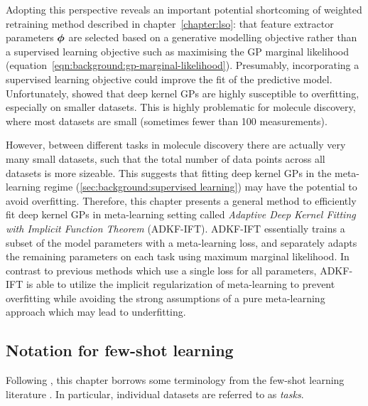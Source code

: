 Adopting this perspective reveals an important potential shortcoming of
weighted retraining method described in chapter~\ref{chapter:lso}:
that feature extractor parameters $\operatorname{\boldsymbol{\phi}}$ are selected based on a generative modelling
objective rather than a supervised learning objective
such as maximising the GP marginal likelihood
(equation~\ref{eqn:background:gp-marginal-likelihood}).
Presumably, incorporating a supervised learning objective
could improve the fit of the predictive model.
Unfortunately, \citet{ober21a} showed that deep kernel GPs
are highly susceptible to overfitting,
especially on smaller datasets.
This is highly problematic for molecule discovery, where most datasets are small
(sometimes fewer than 100 measurements).

However, between different tasks in molecule discovery
there are actually very many small datasets,
such that the total number of data points across all datasets is more sizeable.
This suggests that fitting deep kernel GPs in the meta-learning regime 
(\cref{sec:background:supervised learning}) may have the potential to avoid overfitting.
Therefore, this chapter presents a general method to efficiently fit deep kernel GPs in
meta-learning setting
called \emph{Adaptive Deep Kernel Fitting with Implicit Function Theorem} (ADKF-IFT).
ADKF-IFT essentially trains a subset of the model parameters with a meta-learning loss,
and separately adapts the remaining parameters on each task using maximum marginal likelihood.
In contrast to previous methods which use a single loss for all parameters,
ADKF-IFT is able to utilize the implicit regularization of meta-learning to prevent overfitting
while avoiding the strong assumptions of a pure meta-learning approach which may lead to underfitting.
    
    
\subsection{Notation for few-shot learning}

Following \citet{chen2022meta},
this chapter borrows some terminology from the few-shot learning literature \citep{miller2000learning,lake2011one}.
In particular, individual datasets are referred to as \emph{tasks}.

